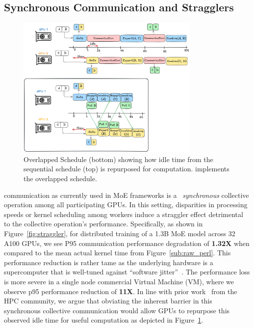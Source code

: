 \subsection{Synchronous Communication and Stragglers}\label{sec:synchronous-communication-and-stragglers}
\begin{figure}[!ht]
    \centering
    \includegraphics[width=0.8\textwidth, keepaspectratio]{figures/s_overlap}
    \caption{Overlapped Schedule (bottom) showing how idle time from the sequential schedule (top)
        is repurposed for computation. \sysname implements the overlapped schedule.}
    \label{fig:overlap}
\end{figure}
\alltoall communication as currently used in MoE frameworks is a ~\emph{synchronous} collective operation among
all participating GPUs. In this setting, disparities in processing speeds or kernel scheduling
among workers induce a straggler effect detrimental to the collective operation's performance.
Specifically, as shown in Figure~\ref{fig:straggler}, for distributed training of a 1.3B MoE model across 32 A100 GPUs,
we see P95 communication performance degradation of \textbf{1.32X} when compared to the mean actual kernel time
from Figure~\ref{sub:raw_perl}.
This performance reduction is rather tame as the underlying hardware is a supercomputer that is
well-tuned against ``software jitter''~\cite{nerscNetworkNERSC}.
The performance loss is more severe in a single node commercial Virtual Machine (VM),
where we observe p95 performance reduction of \textbf{11X}.
In line with prior work~\cite{1639320, 10.1145/3545008.3545056} from the HPC community,
we argue that obviating the inherent barrier in this synchronous collective communication would
allow GPUs to repurpose this observed idle time for useful computation as depicted in Figure~\ref{fig:overlap}.

